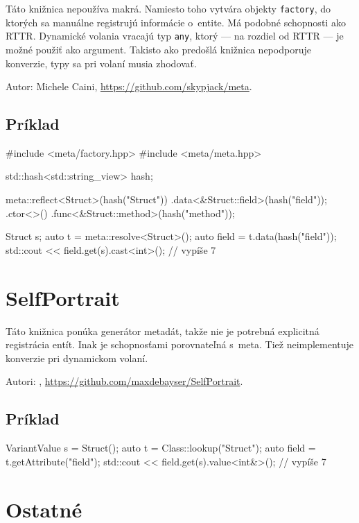 Táto knižnica nepoužíva makrá. Namiesto toho vytvára objekty \texttt{factory}, do ktorých sa manuálne registrujú informácie o~entite. Má podobné schopnosti ako \textsf{RTTR}. Dynamické volania vracajú typ \texttt{any}, ktorý --- na rozdiel od \textsf{RTTR} --- je možné použiť ako argument. Takisto ako predošlá knižnica nepodporuje konverzie, typy sa pri volaní musia zhodovať.

Autor: Michele Caini, \url{https://github.com/skypjack/meta}.

\subsection*{Príklad}

\begin{code}
#include <meta/factory.hpp>
#include <meta/meta.hpp>

std::hash<std::string_view> hash{};

meta::reflect<Struct>(hash("Struct"))
    .data<&Struct::field>(hash("field"));
    .ctor<>()
    .func<&Struct::method>(hash("method"));
    
Struct s;
auto t = meta::resolve<Struct>();
auto field = t.data(hash("field"));
std::cout << field.get(s).cast<int>(); // vypíše 7
\end{code}

\section{\textsf{SelfPortrait}}

Táto knižnica ponúka generátor metadát, takže nie je potrebná explicitná registrácia entít. Inak je schopnosťami porovnateľná s~\textsf{meta}. Tiež neimplementuje konverzie pri dynamickom volaní.

Autori: \citet{bayser2012system}, \url{https://github.com/maxdebayser/SelfPortrait}.

\subsection*{Príklad}

\begin{code}
VariantValue s = Struct();
auto t = Class::lookup("Struct");
auto field = t.getAttribute("field");
std::cout << field.get(s).value<int&>(); // vypíše 7
\end{code}

\section{Ostatné}

